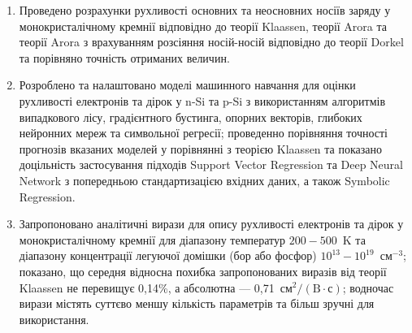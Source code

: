 \documentclass[12pt,a4paper,titlepage,oneside]{book}
\numberwithin{equation}{part}
\renewcommand{\theequation}{\thechapter.\arabic{equation}}
\begin{document}
\begin{enumerate}
  \item Проведено розрахунки рухливості основних та неосновних носіїв заряду у монокристалічному кремнії відповідно до теорії Klaassen,
  теорії Arora та теорії Arora з врахуванням розсіяння носій-носій відповідно до теорії Dorkel та порівняно точність отриманих величин.
  \item Розроблено та налаштовано моделі машинного навчання для оцінки рухливості електронів та дірок у n-Si та p-Si з використанням алгоритмів випадкового лісу,
  градієнтного бустинга, опорних векторів, глибоких нейронних мереж та символьної регресії;
  проведенно порівняння точності прогнозів вказаних моделей у порівнянні з теорією Klaassen та показано доцільність застосування підходів Support Vector Regression
  та Deep Neural Network з попередньою стандартизацією вхідних даних, а також Symbolic Regression.
  \item Запропоновано аналітичні вирази для опису рухливості електронів та дірок у монокристалічному кремнії для діапазону температур $200-500$~K
  та діапазону концентрації легуючої домішки (бор або фосфор) $10^{13}-10^{19}$~см$^{-3}$;
  показано, що середня відносна похибка запропонованих виразів від теорії Klaassen не перевищує 0,14\%,
  а абсолютна --- 0,71~$\text{см}^2/(\text{B}\cdot\text{с})$;
  водночас вирази містять суттєво меншу кількість параметрів та більш зручні для використання.
\end{enumerate}




%



\vspace{-5cm}
\setcounter{page}{3}







\end{document}
